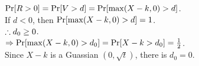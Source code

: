 \begin{pr}
$\P[R>0]=\P[V>d]=\P[\max(X-k, 0)>d]$.\\
If $d<0$, then $\P[\max(X-k, 0)>d]=1$.\\
$\so d_0\geq0$.\\
$\then\P[\max(X-k, 0)>d_0]=\P[X-k>d_0]=\frac12$.\\
Since $X-k$ is a Guassian $(0, \sqrt t)$, there is $d_0=0$.
\end{pr}

